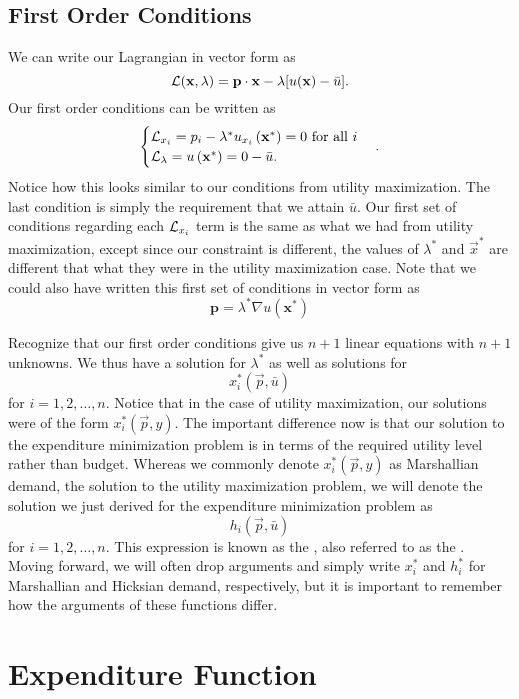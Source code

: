 \subsection*{First Order Conditions}

We can write our Lagrangian in vector form as
$$\mathcal{L}(\mathbf{x}, \lambda)=\mathbf{p} \cdot \mathbf{x} - \lambda[u(\mathbf{x}) - \bar{u}].$$
Our first order conditions can be written as 
$$
\begin{cases}
\mathcal{L}_{x_{i}}=p_{i}-\lambda^{*} u_{x_{i}}\left(\mathbf{x}^{*}\right)=0 \text { for all } i \\
\mathcal{L}_{\lambda}=u\left(\mathbf{x}^{*}\right)=0 - \bar{u}.
\end{cases}.$$
Notice how this looks similar to our conditions from utility maximization. The last condition is simply the requirement that we attain $\bar{u}$. Our first set of conditions regarding each $\mathcal{L}_{x_{i}}$ term is the same as what we had from utility maximization, except since our constraint is different, the values of $\lambda^*$ and $\vec{x}^*$ are different that what they were in the utility maximization case. Note that we could also have written this first set of conditions in vector form as
$$\mathbf{p}=\lambda^{*} \nabla u\left(\mathbf{x}^{*}\right)$$

Recognize that our first order conditions give us $n+1$ linear equations with $n+1$ unknowns. We thus have a solution for $\lambda^*$ as well as solutions for
$$x_i^*(\vec{p}, \bar{u})$$
for $i = 1, 2, \ldots, n$. Notice that in the case of utility maximization, our solutions were of the form $x_i^*(\vec{p}, y)$. The important difference now is that our solution to the expenditure minimization problem is in terms of the required utility level rather than budget. Whereas we commonly denote $x_i^*(\vec{p}, y)$ as Marshallian demand, the solution to the utility maximization problem, we will denote the solution we just derived for the expenditure minimization problem as 
$$h_i(\vec{p}, \bar{u})$$
for $i=1, 2, \ldots, n$. This expression is known as the , also referred to as the . Moving forward, we will often drop arguments and simply write $x_i^*$ and $h_i^*$ for Marshallian and Hicksian demand, respectively, but it is important to remember how the arguments of these functions differ.

\section{Expenditure Function}

